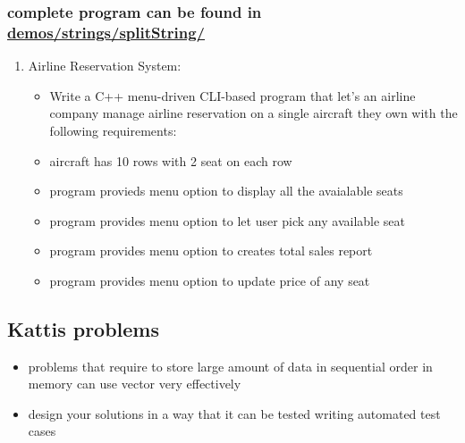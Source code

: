\documentclass[11pt]{article}
\providecommand{\tightlist}{%
      \setlength{\itemsep}{0pt}\setlength{\parskip}{0pt}}
\begin{document}
    \hypertarget{complete-program-can-be-found-in-demosstringssplitstring}{%
\subsubsection{\texorpdfstring{complete program can be found in
\href{./demos/strings/splitString/}{demos/strings/splitString/}}{complete program can be found in demos/strings/splitString/}}\label{complete-program-can-be-found-in-demosstringssplitstring}}

\begin{enumerate}
\def\labelenumi{\arabic{enumi}.}
\setcounter{enumi}{1}
\tightlist
\item
  Airline Reservation System:

  \begin{itemize}
  \tightlist
  \item
    Write a C++ menu-driven CLI-based program that let's an airline
    company manage airline reservation on a single aircraft they own
    with the following requirements:
  \item
    aircraft has 10 rows with 2 seat on each row
  \item
    program provieds menu option to display all the avaialable seats
  \item
    program provides menu option to let user pick any available seat
  \item
    program provides menu option to creates total sales report
  \item
    program provides menu option to update price of any seat
  \end{itemize}
\end{enumerate}

    \hypertarget{kattis-problems}{%
\subsection{Kattis problems}\label{kattis-problems}}

\begin{itemize}
\tightlist
\item
  problems that require to store large amount of data in sequential
  order in memory can use vector very effectively
\item
  design your solutions in a way that it can be tested writing automated
  test cases
\end{itemize}
\end{document}
